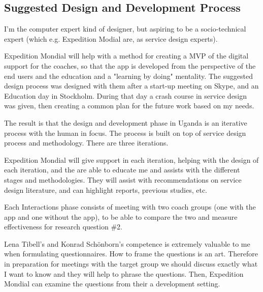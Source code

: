 \subsection{Suggested Design and Development Process}



I'm the computer expert kind of designer, but aspiring to be a socio-technical expert (which e.g. Expedition Modial are, as service design experts).

Expedition Mondial will help with a method for creating a MVP of the digital support for the coaches, so that the app is developed from the perspective of the end users and the education and a "learning by doing" mentality. The suggested design process was designed with them after a start-up meeting on Skype, and an Education day in Stockholm. During that day a crash course in service design was given, then creating a common plan for the future work based on my needs.

The result is that the design and development phase in Uganda is an iterative process with the human in focus. The process is built on top of service design process and methodology. There are three iterations.

Expedition Mondial will give support in each iteration, helping with the design of each iteration, and the are able to educate me and assists with the different stages and methodologies. They will assist with recommendations on service design literature, and can highlight reports, previous studies, etc. 

Each Interactions phase consists of meeting with two coach groups (one with the app and one without the app), to be able to compare the two and measure effectiveness for research question \#2.

Lena Tibell's and Konrad Schönborn's  competence is extremely valuable to me when formulating questionnaires. How to frame the questions is an art.  Therefore in preparation for meetings with the target group we should discuss exactly what I want to know and they will help to phrase the questions. Then, Expedition Mondial can examine the questions from their a development setting. 

